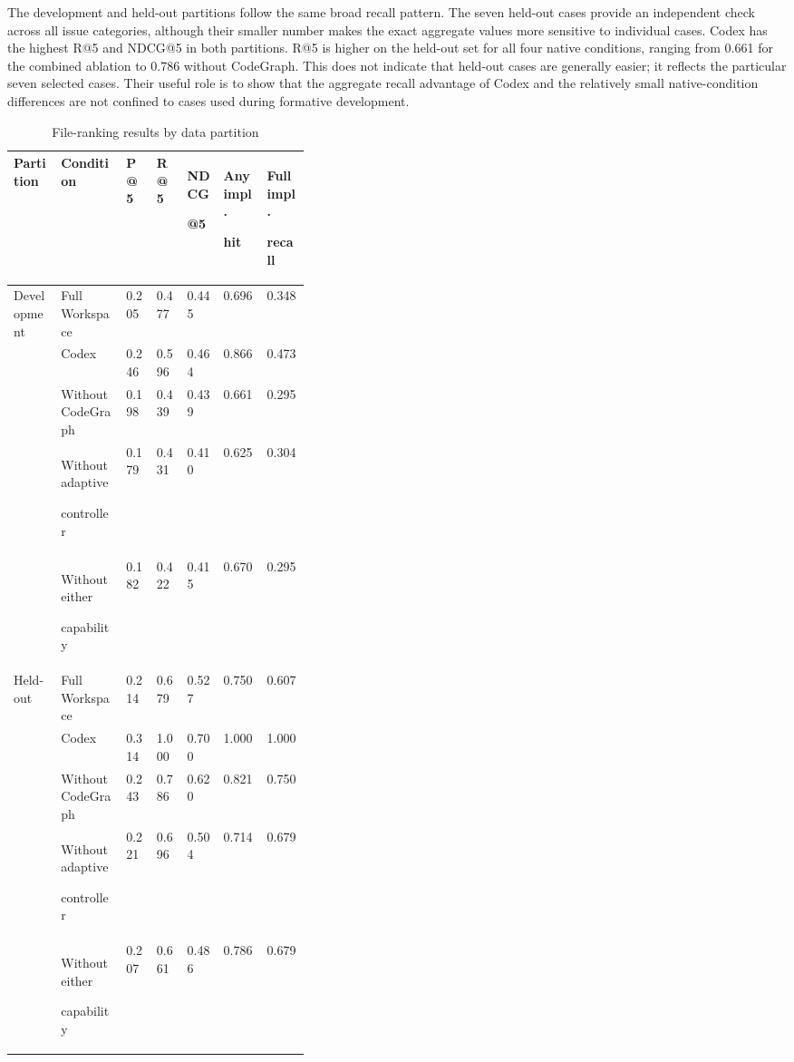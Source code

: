 \begin{samepage}
The development and held-out partitions follow the same broad recall pattern. The seven held-out cases provide an independent check across all issue categories, although their smaller number makes the exact aggregate values more sensitive to individual cases. Codex has the highest R@5 and NDCG@5 in both partitions. R@5 is higher on the held-out set for all four native conditions, ranging from 0.661 for the combined ablation to 0.786 without CodeGraph. This does not indicate that held-out cases are generally easier; it reflects the particular seven selected cases. Their useful role is to show that the aggregate recall advantage of Codex and the relatively small native-condition differences are not confined to cases used during formative development.
\end{samepage}

\begin{table}[htbp]
\centering
\caption{File-ranking results by data partition}\label{tab:file-ranking-results-by-data-partition-2}

\begingroup
\small
\setlength{\tabcolsep}{3pt}
\renewcommand{\arraystretch}{1.10}
\begin{tabularx}{0.99\linewidth}{@{}L{0.16\linewidth}L{0.22\linewidth}*{5}{Z}@{}}
\toprule
\textbf{Partition} & \textbf{Condition} & \textbf{P@5} & \textbf{R@5} & \textbf{NDCG}\par\textbf{@5} & \textbf{Any impl.}\par\textbf{hit} & \textbf{Full impl.}\par\textbf{recall} \\
\midrule
Development & Full Workspace & 0.205 & 0.477 & 0.445 & 0.696 & 0.348 \\
 & Codex & 0.246 & 0.596 & 0.464 & 0.866 & 0.473 \\
 & Without CodeGraph & 0.198 & 0.439 & 0.439 & 0.661 & 0.295 \\
 & Without adaptive\par controller & 0.179 & 0.431 & 0.410 & 0.625 & 0.304 \\
 & Without either\par capability & 0.182 & 0.422 & 0.415 & 0.670 & 0.295 \\
Held-out & Full Workspace & 0.214 & 0.679 & 0.527 & 0.750 & 0.607 \\
 & Codex & 0.314 & 1.000 & 0.700 & 1.000 & 1.000 \\
 & Without CodeGraph & 0.243 & 0.786 & 0.620 & 0.821 & 0.750 \\
 & Without adaptive\par controller & 0.221 & 0.696 & 0.504 & 0.714 & 0.679 \\
 & Without either\par capability & 0.207 & 0.661 & 0.486 & 0.786 & 0.679 \\
\bottomrule
\end{tabularx}
\endgroup
\end{table}
\FloatBarrier


